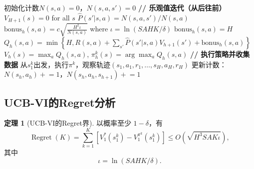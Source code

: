 \documentclass[11pt,a4paper]{article}
\theoremstyle{definition}
\newtheorem{theorem}{定理}[section]
\begin{document}
\begin{algorithm}[H]
\caption{UCB-VI（完整版）}
\begin{algorithmic}[1]
\State 初始化计数$N(s,a) = 0$，$N(s,a,s') = 0$
    \State \textbf{// 乐观值迭代（从后往前）}
    \State $V_{H+1}(s) = 0$ for all $s$
                \State $\hat{P}(s'|s,a) = N(s,a,s') / N(s,a)$
                \State $\text{bonus}_h(s,a) = c\sqrt{\frac{H^2 \iota}{N(s,a)}}$ where $\iota = \ln(SAH K/\delta)$
            \Else
                \State $\text{bonus}_h(s,a) = H$ 
            \EndIf
            \State $Q_h(s,a) = \min\left\{H, R(s,a) + \sum_{s'} \hat{P}(s'|s,a) V_{h+1}(s') + \text{bonus}_h(s,a)\right\}$
        \EndFor
        \State $V_h(s) = \max_a Q_h(s,a)$, \quad $\pi_h^k(s) = \arg\max_a Q_h(s,a)$
    \EndFor
    \State \textbf{// 执行策略并收集数据}
    \State 从$s_1^k$出发，执行$\pi^k$，观察轨迹$(s_1, a_1, r_1, \ldots, s_H, a_H, r_H)$
    \State 更新计数：$N(s_h, a_h) \mathrel{+}= 1$，$N(s_h, a_h, s_{h+1}) \mathrel{+}= 1$
\EndFor
\end{algorithmic}
\end{algorithm}

\subsection{UCB-VI的Regret分析}

\begin{theorem}[UCB-VI的Regret界]
以概率至少 $1-\delta$，有
\[
\operatorname{Regret}(K)
=
\sum_{k=1}^K
\left[
V_1^*(s_1^k)-V_1^{\pi^k}(s_1^k)
\right]
\leq
O\left(\sqrt{H^3SAK\iota}\right),
\]
其中
\[
\iota=\ln(SAHK/\delta).
\]
\end{theorem}
\end{document}
